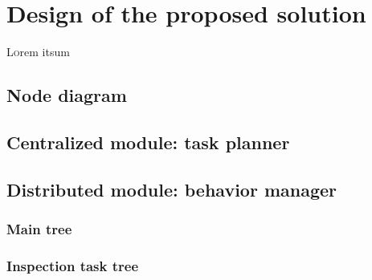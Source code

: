 \chapter{Design of the proposed solution}
\label{ch:DesignOfTheProposedSolution}
\lettrine[lraise=-0.1, lines=2, loversize=0.2]{L}{o}rem itsum


\section{Node diagram}
\label{sec:NodeDiagram}

\section{Centralized module: task planner}
\label{sec:Centralized module:TaskPlanner}

\section{Distributed module: behavior manager}
\label{sec:Distributed module: behavior manager}

\subsection{Main tree}
\label{sec:MainTree}

\subsection{Inspection task tree}
\label{sec:InspectionTaskTree}

